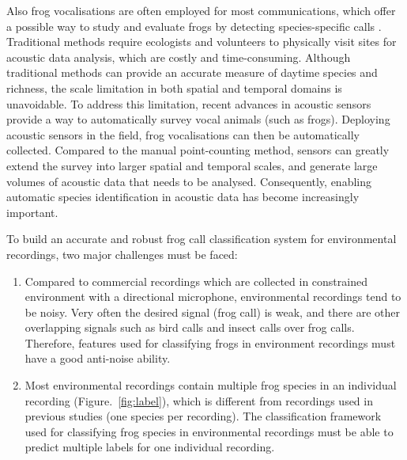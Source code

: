 Also frog vocalisations are often employed for most communications, which offer a possible way to study and evaluate frogs by detecting species-specific calls \citep{dorcas2009auditory}. Traditional methods require ecologists and volunteers to physically visit sites for acoustic data analysis, which are costly and time-consuming. 
Although traditional methods can provide an accurate measure of daytime species and richness, the scale limitation in both spatial and temporal domains is unavoidable. To address this limitation, recent advances in acoustic sensors provide a way to automatically survey vocal animals (such as frogs). Deploying acoustic sensors in the field, frog vocalisations can then be automatically collected. Compared to the manual point-counting method, sensors can greatly extend the survey into larger spatial and temporal scales, and generate large volumes of acoustic data that needs to be analysed. Consequently, enabling automatic species identification in acoustic data has become increasingly important. 



To build an accurate and robust frog call classification system for environmental recordings, two major challenges must be faced:

\begin{enumerate}
\item  Compared to commercial recordings which are collected in constrained environment with a directional microphone, environmental recordings tend to be noisy. Very often the desired signal (frog call) is weak, and there are other overlapping signals such as bird calls and insect calls over frog calls. Therefore, features used for classifying frogs in environment recordings must have a good anti-noise ability.


\item  Most environmental recordings contain multiple frog species in an individual recording (Figure.~\ref{fig:label}), which is different from recordings used in previous studies (one species per recording). The classification framework used for classifying frog species in environmental recordings must be able to predict multiple labels for one individual recording.



\end{enumerate}
 


